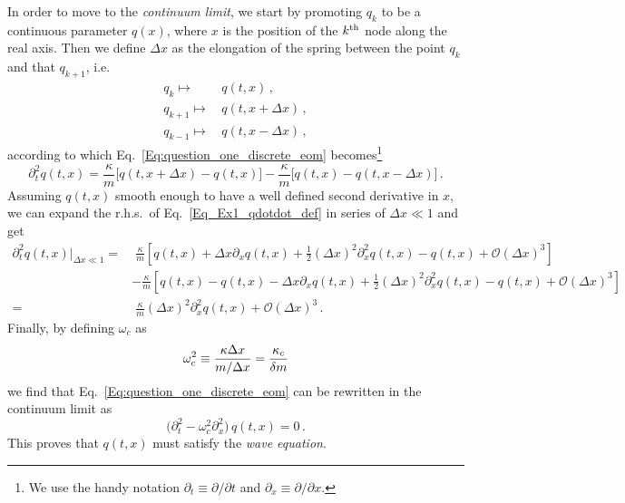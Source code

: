 \begin{sol}
    In order to move to the \emph{continuum limit}, we start by promoting $q_k$ to be a continuous parameter $q(x)$, where $x$ is the position of the $k^{\rm th}$ node along the real axis. Then we define $\Delta x$ as the elongation of the spring between the point $q_k$ and that $q_{k+1}$, i.e.
    \begin{equation}
    \begin{split}
        q_k \mapsto & \, q(t,x) \, , \\
        q_{k+1} \mapsto & \, q(t, x + \Delta x) \, , \\
        q_{k-1} \mapsto & \, q(t, x - \Delta x) \, ,
    \end{split}
    \end{equation}
    according to which Eq.~\eqref{Eq:question_one_discrete_eom} becomes\footnote{We use the handy notation $\partial_t \equiv \partial/\partial t$ and $\partial_x \equiv \partial/\partial x$.}
    \begin{equation}
        \partial_t^2 q(t,x) = \frac{\kappa}{m} \big[q(t, x+\Delta x) - q(t,x)\big] - \frac{\kappa}{m} \big[q(t,x) - q(t, x-\Delta x)\big] \, .
        \label{Eq_Ex1_qdotdot_def}
    \end{equation}
    Assuming $q(t,x)$ smooth enough to have a well defined second derivative in $x$, we can expand the r.h.s.~of Eq.~\eqref{Eq_Ex1_qdotdot_def} in series of $\Delta x \ll 1$ and get
    \begin{equation}
    \begin{split}
        \partial_t^2 q(t,x)|_{\Delta x \ll 1} = & \; \frac{\kappa}{m} \left[q(t,x) + \Delta x \partial_x q(t,x) + \frac{1}{2}(\Delta x)^2 \partial_x^2 q(t,x) - q(t,x) + \mathcal{O}(\Delta x)^3\right] \\
        & - \frac{\kappa}{m} \left[q(t,x) - q(t,x) - \Delta x \partial_x q(t,x) + \frac{1}{2}(\Delta x)^2 \partial_x^2 q(t,x) - q(t,x) + \mathcal{O}(\Delta x)^3\right] \\
        = & \; \frac{\kappa}{m} (\Delta x)^2 \partial_x^2 q(t,x) + \mathcal{O}(\Delta x)^3 \, .
    \end{split}
    \end{equation}
    Finally, by defining $\omega_c$ as
    \begin{equation}
        \omega_c^2 \equiv \frac{\kappa \Delta x}{m/ \Delta x} = \frac{\kappa_c}{\delta m}  
        \label{Eq_Ex1_omega_c_def}
    \end{equation}
    we find that Eq.~\eqref{Eq:question_one_discrete_eom} can be rewritten in the continuum limit as
    \begin{equation}
        \big(\partial_t^2 - \omega_c^2 \partial_x^2\big) \, q(t,x) = 0 \, .    
    \end{equation}
    This proves that $q(t,x)$ must satisfy the \emph{wave equation}. 


\end{sol}
